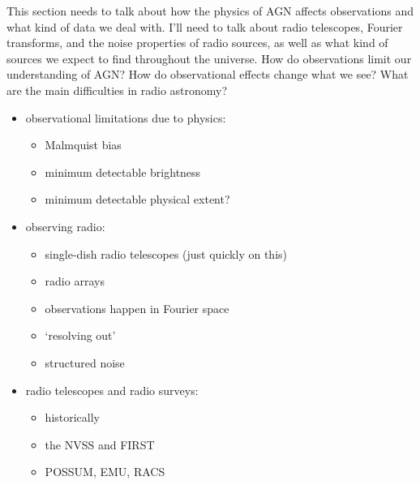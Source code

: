 This section needs to talk about how the physics of AGN affects observations and what kind of data we deal with. I'll need to talk about radio telescopes, Fourier transforms, and the noise properties of radio sources, as well as what kind of sources we expect to find throughout the universe. How do observations limit our understanding of AGN? How do observational effects change what we see? What are the main difficulties in radio astronomy?

    \begin{itemize}
        \item observational limitations due to physics: \begin{itemize}
            \item Malmquist bias
            \item minimum detectable brightness
            \item minimum detectable physical extent?
        \end{itemize}
        \item observing radio: \begin{itemize}
            \item single-dish radio telescopes (just quickly on this)
            \item radio arrays
            \item observations happen in Fourier space
            \item `resolving out'
            \item structured noise
        \end{itemize}
        \item radio telescopes and radio surveys: \begin{itemize}
            \item historically
            \item the NVSS and FIRST
            \item POSSUM, EMU, RACS
        \end{itemize}
    \end{itemize}


